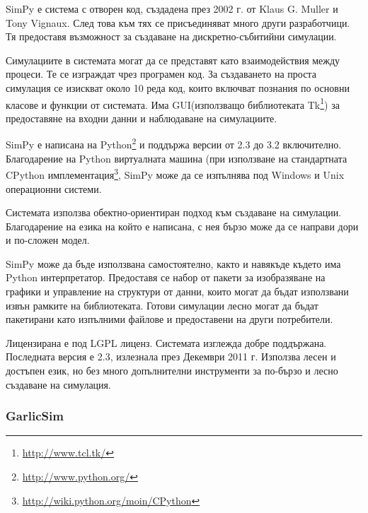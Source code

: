 			SimPy е система с отворен код, създадена през 2002 г. от Klaus G. Muller и Tony Vignaux. След това
			към тях се присъединяват много други разработчици. 
			Тя предоставя възможност за създаване на дискретно-събитийни симулации.
			
			
				Симулациите в системата могат да се представят като взаимодействия между процеси. Те се изграждат чрез
				програмен код. За създаването на проста симулация се изискват около 10 реда код, 
				които включват познания по основни класове и функции от системата. Има GUI(използващо библиотеката 
				Tk\footnote{\url{http://www.tcl.tk/}}) за предоставяне на входни данни и наблюдаване на симулациите.						
			
			
				SimPy е написана на Python\footnote{\url{http://www.python.org/}} и поддържа версии от 2.3 до 3.2 включително.
				Благодарение на Python виртуалната машина (при използване на стандартната CPython 
				имплементация\footnote{\url{http://wiki.python.org/moin/CPython}}, SimPy може да се изпълнява под 
				Windows и Unix операционни системи.
			
			
				Системата използва обектно-ориентиран подход към създаване на симулации. Благодарение на езика на който е
				написана, с нея бързо може да се направи дори и по-сложен модел.
			
						
				SimPy може да бъде използвана самостоятелно, както и навякъде където има Python интерпретатор.
				Предоставя се набор от пакети за изобразяване на графики и управление на структури от данни, които могат
				да бъдат използвани извън рамките на библиотеката. Готови симулации лесно могат да бъдат пакетирани
				като изпълними файлове и предоставени на други потребители.

			
				Лицензирана е под \ac{LGPL} лиценз. Системата изглежда добре поддържана. Последната версия е 2.3, излезнала през 
				Декември 2011 г. Използва лесен и достъпен език, но без много допълнителни инструменти за по-бързо и лесно
				създаване на симулация. \cite{SimPy}
				
		\subsubsection{GarlicSim}			
			
